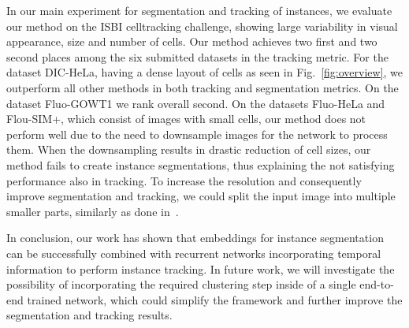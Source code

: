 \documentclass[runningheads,a4paper]{llncs}
\begin{document}
In our main experiment for segmentation and tracking of instances, we evaluate our method on the ISBI celltracking challenge, showing large variability in visual appearance, size and number of cells.
Our method achieves two first and two second places among the six submitted datasets in the tracking metric.
For the dataset DIC-HeLa, having a dense layout of cells as seen in Fig.~\ref{fig:overview}, we outperform all other methods in both tracking and segmentation metrics. %
On the dataset Fluo-GOWT1 we rank overall second.
On the datasets Fluo-HeLa and Flou-SIM+, which consist of images with small cells, our method does not perform well due to  the need to downsample images for the network to process them.
When the downsampling results in drastic reduction of cell sizes, our method fails to create instance segmentations, %
thus explaining the not satisfying performance also in tracking.
To increase the resolution and consequently improve segmentation and tracking, we could split the input image into multiple smaller parts, similarly as done in~\cite{Ronneberger2015}.

In conclusion, our work has shown that embeddings for instance segmentation can be successfully combined with recurrent networks incorporating temporal information to perform instance tracking.
In future work, we will investigate the possibility of incorporating the required clustering step inside of a single end-to-end trained network, which could simplify the framework and further improve the segmentation and tracking results.




\end{document}
